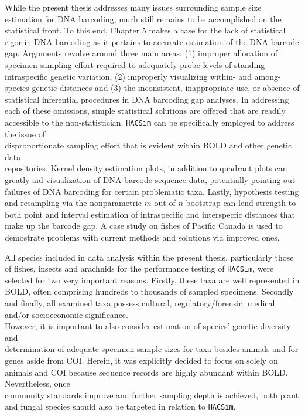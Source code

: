 While the present thesis addresses many issues surrounding sample size estimation for DNA barcoding, much still remains to be accomplished on the statistical front.  To this end, Chapter 5 makes a case for the lack of statistical rigor in DNA barcoding as it pertains to accurate estimation of the DNA barcode gap. Arguments revolve around three main areas: (1) improper allocation of specimen sampling effort required to adequately probe levels of standing intraspecific genetic variation, (2) improperly visualizing within- and among-species genetic distances and (3) the inconsistent, inappropriate use, or absence of statistical inferential procedures in DNA barcoding gap analyses. In addressing each of these omissions, simple statistical solutions are offered that are readily accessible to the non-statistician. {\tt HACSim} can be specifically employed to address the issue of \\ disproportionate sampling effort that is evident within BOLD and other genetic data \\ repositories. Kernel density estimation plots, in addition to quadrant plots can greatly aid visualization of DNA barcode sequence data, potentially pointing out failures of DNA barcoding for certain problematic taxa. Lastly, hypothesis testing and resampling via the nonparametric $m$-out-of-$n$ bootstrap can lend strength to both point and interval estimation of intraspecific and interspecfic distances that make up the barcode gap. A case study on fishes of Pacific Canada is used to demostrate problems with current methods and solutions via improved ones.

All species included in data analysis within the present thesis, particularly those of fishes, insects and arachnids for the performance testing of 
{\tt HACSim}, were selected for two very important reasons. Firstly, these taxa are well represented in BOLD, often comprising hundreds to thousands of sampled specimens. Secondly and finally, all examined taxa possess cultural, regulatory/forensic, medical and/or socioeconomic significance. 
\\ However, it is important to also consider estimation of species' genetic diversity and \\ determination of adequate specimen sample sizes for taxa besides animals and for genes aside from COI. Herein, it was explicitly decided to focus on solely on animals and COI because sequence records are highly abundant within BOLD. Nevertheless, once \\ community standards improve and further sampling depth is achieved, both plant and fungal species should also be targeted in relation to {\tt HACSim}.  

  


